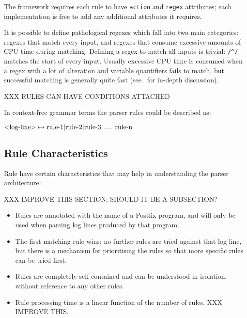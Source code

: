 The framework requires each rule to have \texttt{action} and \texttt{regex}
attributes; each implementation is free to add any additional attributes it
requires.

It is possible to define pathological regexes which fall into two main
categories: regexes that match every input, and regexes that consume
excessive amounts of CPU time during matching.  Defining a regex to match
all inputs is trivial: \verb!/^/! matches the start of every input.
Usually excessive CPU time is consumed when a regex with a lot of
alteration and variable quantifiers fails to match, but successful
matching is generally quite fast (see~\cite{mastering-regular-expressions}
for in-depth discussion).

XXX RULES CAN HAVE CONDITIONS ATTACHED

\label{comparison against context-free grammars}

In context-free grammar terms the parser rules could be described as:

$\text{\textless{}log-line\textgreater{}} \mapsto \text{rule-1} |
\text{rule-2} | \text{rule-3} | \dots | \text{rule-n}$


\subsection{Rule Characteristics}

\label{rule characteristics in architecture}

Rule have certain characteristics that may help in understanding the
parser architecture:

XXX IMPROVE THIS SECTION\@; SHOULD IT BE A SUBSECTION\@?

\begin{itemize}

    \item Rules are annotated with the name of a Postfix program, and will
        only be used when parsing log lines produced by that
        program.

    \item The first matching rule wins: no further rules are tried against
        that log line, but there is a mechanism for prioritising the rules
        so that more specific rules can be tried first.

    \item Rules are completely self-contained and can be understood in
        isolation, without reference to any other rules.

    \item Rule processing time is a linear function of the number of rules.
        XXX IMPROVE THIS\@.

\end{itemize}

